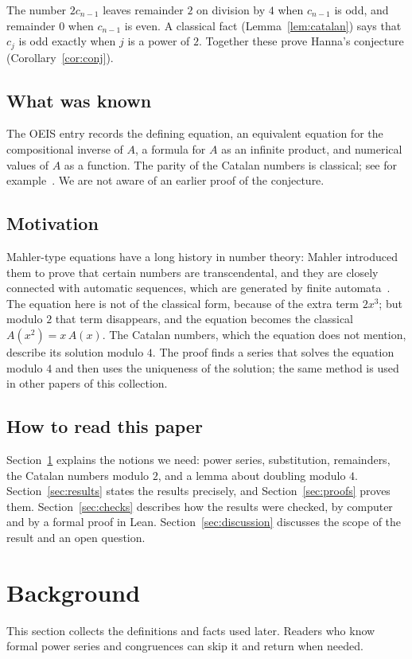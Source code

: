 \documentclass[11pt,a4paper]{article}
\theoremstyle{definition}
\theoremstyle{remark}
\begin{document}
The number $2c_{n-1}$ leaves remainder $2$ on division by $4$ when $c_{n-1}$ is odd, and remainder $0$ when $c_{n-1}$ is
even. A classical fact (Lemma~\ref{lem:catalan}) says that $c_j$ is odd exactly when $j$ is a power of $2$. Together
these prove Hanna's conjecture (Corollary~\ref{cor:conj}).

\subsection{What was known}
The OEIS entry records the defining equation, an equivalent equation for the compositional inverse of $A$, a formula
for $A$ as an infinite product, and numerical values of $A$ as a function. The parity of the Catalan numbers is classical;
see for example~\cite{deutschsagan}. We are not aware of an earlier proof of the conjecture.

\subsection{Motivation}
Mahler-type equations have a long history in number theory: Mahler introduced them to prove that certain numbers are
transcendental, and they are closely connected with automatic sequences, which are generated by finite
automata~\cite{allouche}. The equation here is not of the classical form, because of the extra term $2x^3$; but
modulo $2$ that term disappears, and the equation becomes the classical $A(x^2)=x\,A(x)$. The Catalan numbers, which the equation does not mention, describe its solution
modulo $4$. The proof finds a series that solves the equation modulo $4$ and then uses the uniqueness of the solution;
the same method is used in other papers of this collection.

\subsection{How to read this paper}
Section~\ref{sec:background} explains the notions we need: power series, substitution, remainders, the Catalan numbers
modulo $2$, and a lemma about doubling modulo $4$. Section~\ref{sec:results} states the results precisely, and
Section~\ref{sec:proofs} proves them. Section~\ref{sec:checks} describes how the results were checked, by computer and
by a formal proof in Lean. Section~\ref{sec:discussion} discusses the scope of the result and an open question.
\section{Background}\label{sec:background}
This section collects the definitions and facts used later. Readers who know formal power series and congruences can skip it and return when needed.
\end{document}
